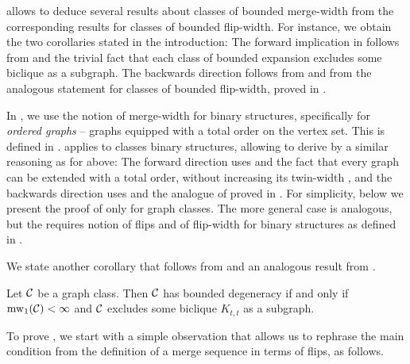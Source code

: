  allows to deduce several results about classes of bounded merge-width
from the corresponding results for classes of bounded flip-width.
For instance, we obtain the two corollaries stated in the introduction:
\corbe*
The forward implication in  follows from  and the trivial fact that each class of bounded expansion excludes some biclique as a subgraph. The backwards direction follows from  and from the analogous statement for classes of bounded flip-width, proved in \cite[Thm. VI.3]{flip-width}.


\cortww*
In , we use the notion of merge-width for binary structures, specifically for \emph{ordered graphs} --  graphs equipped with a total order on the vertex set. This is defined in .   applies to classes binary structures, allowing to derive  by a similar reasoning as for  above:
The forward direction uses and the fact that every graph can be extended with a total order, without increasing its twin-width \cite{tww4}, and the backwards direction uses  and the analogue of  proved in \cite[Thm. VII.3]{flip-width}.
For simplicity, below we present the proof of  only for graph classes. The more general case is analogous, 
but the requires notion of flips and of flip-width for binary structures as defined in \cite[Sec. V.B]{flip-width}.

We state another corollary that follows from  and an analogous result from \cite[Thm. VI.1]{flip-width}.
\begin{corollary}\label{cor:deg}
  Let $\mathcal C$ be a graph class. Then $\mathcal C$ has bounded degeneracy if and only if $\operatorname{mw}_1(\mathcal C)<\infty$ and $\mathcal C$ excludes some biclique $K_{t,t}$ as a subgraph.
\end{corollary}




\medskip
To prove ,
we start with a simple observation that allows us to rephrase the main condition from the definition 
of a merge sequence in terms of flips, as follows.


